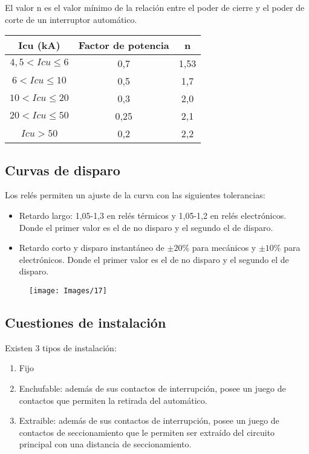 El valor n es el valor mínimo de la relación entre el poder de cierre y el poder de corte de un interruptor automático.
\begin{table}[H]
	\centering
	\begin{tabular}{|c|c|c|}
		\hline
		\textbf{Icu (kA)}            & \textbf{Factor de potencia} & \textbf{n} \\ \hline
		$4,5 < Icu \leq 6$           & 0,7                         & 1,53       \\ \hline
		$6 < Icu \leq 10$            & 0,5                         & 1,7        \\ \hline
		$10 < Icu \leq 20$           & 0,3                         & 2,0        \\ \hline
		$20 < Icu \leq 50$           & 0,25                        & 2,1        \\ \hline
		$Icu > 50$                   & 0,2                         & 2,2        \\ \hline
	\end{tabular}
\end{table}
\subsection{Curvas de disparo}
Los relés permiten un ajuste de la curva con las siguientes tolerancias:
\begin{itemize}
	\item Retardo largo: 1,05-1,3 en relés térmicos y 1,05-1,2 en relés electrónicos. Donde el primer valor es el de no disparo y el segundo el de disparo.
	\item Retardo corto y disparo instantáneo de $\pm20\%$ para mecánicos y $\pm10\%$ para electrónicos. Donde el primer valor es el de no disparo y el segundo el de disparo.
\end{itemize}
\begin{figure}[H]
	\centering
	\texttt{[image: Images/17]}
	\label{fig:17}
\end{figure}


\subsection{Cuestiones de instalación}
Existen 3 tipos de instalación:
\begin{enumerate}
	\item Fijo
	\item Enchufable: además de sus contactos de interrupción, posee un juego de contactos que permiten la retirada del automático.
	\item Extraible: además de sus contactos de interrupción, posee un juego de contactos de seccionamiento que le permiten ser extraído del circuito principal con una distancia de seccionamiento.
\end{enumerate}

